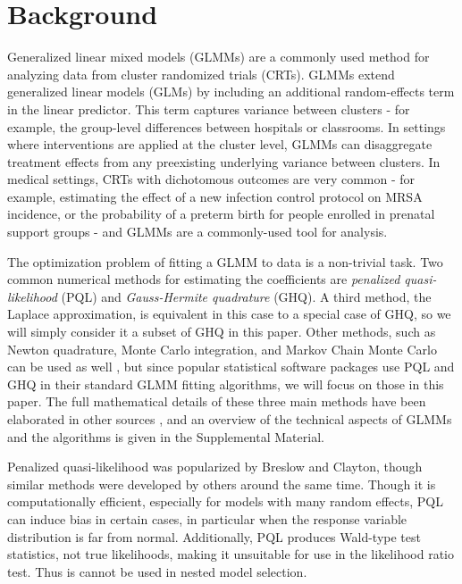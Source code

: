 \documentclass[Afour,times,sagev,doublespace]{sagej}
\begin{document}
\section{Background}
Generalized linear mixed models (GLMMs) are a commonly used method for analyzing data from cluster randomized trials (CRTs). GLMMs extend generalized linear models (GLMs) by including an additional random-effects term in the linear predictor. This term captures variance between clusters - for example, the group-level differences between hospitals or classrooms. In settings where interventions are applied at the cluster level, GLMMs can disaggregate treatment effects from any preexisting underlying variance between clusters. In medical settings, CRTs with dichotomous outcomes are very common - for example, estimating the effect of a new infection control protocol on MRSA incidence, or the probability of a preterm birth for people enrolled in prenatal support groups - and GLMMs are a commonly-used tool for analysis. 

The optimization problem of fitting a GLMM to data is a non-trivial task. Two common numerical methods for estimating the coefficients are \textit{penalized quasi-likelihood} (PQL) and \textit{Gauss-Hermite quadrature} (GHQ). A third method, the Laplace approximation, is equivalent in this case to a special case of GHQ\cite{liu_note_1994}, so we will simply consider it a subset of GHQ in this paper. Other methods, such as Newton quadrature, Monte Carlo integration, and Markov Chain Monte Carlo can be used as well \cite{zhang_fitting_2011}, but since popular statistical software packages use PQL and GHQ in their standard GLMM fitting algorithms, we will focus on those in this paper. The full mathematical details of these three main methods have been elaborated in other sources \cite{wolfinger_generalized_1993}\cite{pinheiro_efficient_2006}, and an overview of the technical aspects of GLMMs and the algorithms is given in the Supplemental Material.

Penalized quasi-likelihood was popularized by Breslow and Clayton\cite{breslow_approximate_1993}, though similar methods were developed by others\cite{zeger_models_1988}\cite{engel_simple_1994} around the same time. Though it is computationally efficient, especially for models with many random effects, PQL can induce bias in certain cases, in particular when the response variable distribution is far from normal\cite{agresti_categorical_2013}\cite{rodriguez_assessment_1995}\cite{breslow_bias_1995}\cite{lin_bias_1996}. Additionally, PQL produces Wald-type test statistics, not true likelihoods, making it unsuitable for use in the likelihood ratio test. Thus is cannot be used in nested model selection\cite{zhang_fitting_2011}\cite{pinheiro_efficient_2006}\cite{ng_estimation_2006}.
\end{document}
